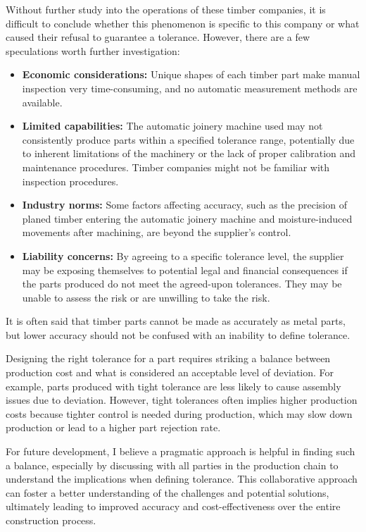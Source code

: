 \documentclass[11pt]{book}
\begin{document}
Without further study into the operations of these timber companies, it is difficult to conclude whether this phenomenon is specific to this company or what caused their refusal to guarantee a tolerance. However, there are a few speculations worth further investigation:

\begin{itemize}
	\item \textbf{Economic considerations: }Unique shapes of each timber part make manual inspection very time-consuming, and no automatic measurement methods are available.

	\item \textbf{Limited capabilities: }The automatic joinery machine used may not consistently produce parts within a specified tolerance range, potentially due to inherent limitations of the machinery or the lack of proper calibration and maintenance procedures. Timber companies might not be familiar with inspection procedures.

	\item \textbf{Industry norms:} Some factors affecting accuracy, such as the precision of planed timber entering the automatic joinery machine and moisture-induced movements after machining, are beyond the supplier's control.

	\item \textbf{Liability concerns: }By agreeing to a specific tolerance level, the supplier may be exposing themselves to potential legal and financial consequences if the parts produced do not meet the agreed-upon tolerances. They may be unable to assess the risk or are unwilling to take the risk.

\end{itemize}
It is often said that timber parts cannot be made as accurately as metal parts, but lower accuracy should not be confused with an inability to define tolerance. 

Designing the right tolerance for a part requires striking a balance between production cost and what is considered an acceptable level of deviation. For example, parts produced with tight tolerance are less likely to cause assembly issues due to deviation. However, tight tolerances often implies higher production costs because tighter control is needed during production, which may slow down production or lead to a higher part rejection rate.

For future development, I believe a pragmatic approach is helpful in finding such a balance, especially by discussing with all parties in the production chain to understand the implications when defining tolerance. This collaborative approach can foster a better understanding of the challenges and potential solutions, ultimately leading to improved accuracy and cost-effectiveness over the entire construction process.
\end{document}
